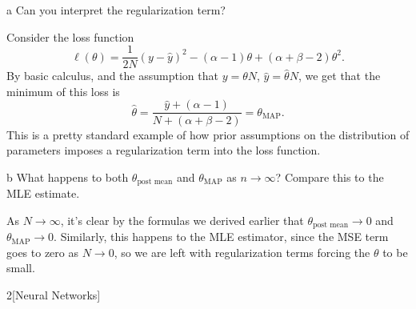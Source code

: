 \documentclass[expanded]{lkx_pset}
\begin{document}
\begin{solution}
\begin{parts}
\begin{part}{a}
			Can you interpret the regularization term?
		\end{part}

		Consider the loss function
		\[
			\ell(\theta) = \frac{1}{2N}(y-\widehat{y})^2-(\alpha-1)\theta+(\alpha+\beta-2)\theta^2.
		\]
		By basic calculus, and the assumption that $y=\theta N$, $\widehat{y}=\widehat{\theta} N$, we get that the minimum of this loss is
		\[
			\widehat{\theta} = \frac{\widehat{y}+(\alpha-1)}{N+(\alpha+\beta-2)} = \theta_{\textrm{MAP}}.
		\]
		This is a pretty standard example of how prior assumptions on the distribution of parameters imposes a regularization term into the loss function.

		\begin{part}{b}
			What happens to both $\theta_{\text{post mean}}$ and $\theta_{\text{MAP}}$ as \(n \to \infty\)? Compare this to the MLE estimate.
		\end{part}

		As $N\to \infty$, it's clear by the formulas we derived earlier that $\theta_{\text{post mean}}\to 0$ and $\theta_{\textrm{MAP}}\to 0$. Similarly, this happens to the MLE estimator, since the MSE term goes to zero as $N\to 0$, so we are left with regularization terms forcing the $\theta$ to be small.
	\end{parts}
\end{solution}

\begin{problem}{2}[Neural Networks]
\end{problem}
\end{document}
